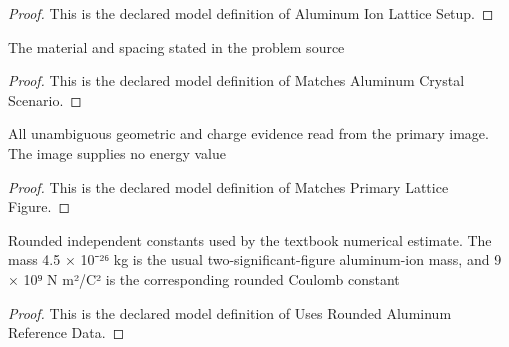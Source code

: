 \begin{proof}
  This is the declared model definition of Aluminum Ion Lattice Setup.
\end{proof}
\begin{definition}
  \label{def:physics:phyx-mini-0658:phyxminiproblems-problemphyxmini0658-matchesaluminumcrystalscenario}
  The material and spacing stated in the problem source
\end{definition}
\begin{proof}
  This is the declared model definition of Matches Aluminum Crystal Scenario.
\end{proof}
\begin{definition}
  \label{def:physics:phyx-mini-0658:phyxminiproblems-problemphyxmini0658-matchesprimarylatticefigure}
  All unambiguous geometric and charge evidence read from the primary image. The image supplies no energy value
\end{definition}
\begin{proof}
  This is the declared model definition of Matches Primary Lattice Figure.
\end{proof}
\begin{definition}
  \label{def:physics:phyx-mini-0658:phyxminiproblems-problemphyxmini0658-usesroundedaluminumreferencedata}
  Rounded independent constants used by the textbook numerical estimate. The mass 4.5 × 10⁻²⁶ kg is the usual two-significant-figure aluminum-ion mass, and 9 × 10⁹ N m²/C² is the corresponding rounded Coulomb constant
\end{definition}
\begin{proof}
  This is the declared model definition of Uses Rounded Aluminum Reference Data.
\end{proof}
